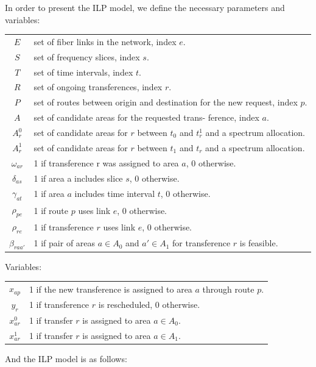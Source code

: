 \documentclass[11pt,a4paper]{article}
\begin{document}
In order to present the ILP model, we define the necessary parameters and variables:
\begin{table}[H]
\small
\begin{tabular}{c l}
$E$ & set of fiber links in the network, index $e$.\\
$S$ &  set of frequency slices, index $s$.\\
$T$ & set of time intervals, index $t$.\\
$R$ & set of ongoing transferences, index $r$.\\
$P$ & set of routes between origin and destination for the new request, index $p$.\\
$A$ & set of candidate areas for the requested trans- ference, index $a$.\\
$A^{0}_{r}$ & set of candidate areas for $r$ between $t_{0}$ and $t^{1}_{r}$ and a spectrum allocation.\\
$A^{1}_{r}$ & set of candidate areas for $r$ between $t_{1}$ and $t_{r}$ and a spectrum allocation.\\
$\omega_{ar}$ & 1 if transference r was assigned to area $a$, 0 otherwise.\\
$\delta_{as}$ & 1 if area a includes slice $s$, 0 otherwise.\\
$\gamma_{at}$ & 1 if area $a$ includes time interval $t$, 0 otherwise.\\ 
$\rho_{pe}$ & 1 if route $p$ uses link $e$, 0 otherwise.\\
$\rho_{re}$ & 1 if transference $r$ uses link $e$, 0 otherwise.\\
$\beta_{raa'}$ & 1 if pair of areas $a \in A_{0}$ and $a' \in A_{1}$ for transference $r$ is feasible.\\
\end{tabular}
\end{table}
Variables:
\begin{table}[H]
\small
\begin{tabular}{c l}
$x_{ap}$ & 1 if the new transference is assigned to area $a$ through route $p$.\\
$y_{r}$ & 1 if transference $r$ is rescheduled, 0 otherwise.\\
$x^{0}_{ar}$ & 1 if transfer $r$ is assigned to area $a \in A_{0}$.\\
$x^{1}_{ar}$ & 1 if transfer $r$ is assigned to area $a \in A_{1}$.\\
\end{tabular}
\end{table}
And the ILP model is as follows:\\\\
\end{document}
